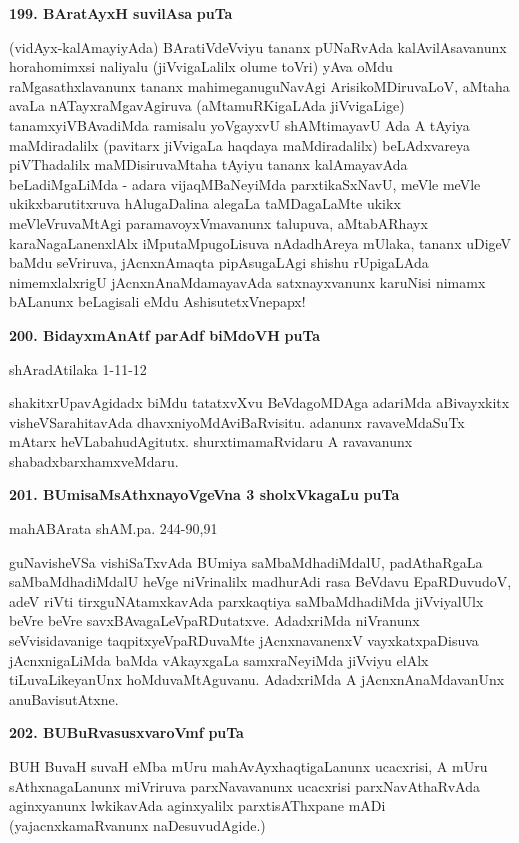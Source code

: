 \medskip
\noindent
\textbf{199. BAratAyxH suvilAsa} \hfill{\bf puTa \pageref{75a}}

\smallskip
(vidAyx-kalAmayiyAda) BAratiVdeVviyu tananx pUNaRvAda kalAvilAsavanunx horahomimxsi naliyalu (jiVvigaLalilx olume toVri) yAva oMdu raMgasathxlavanunx tananx mahimeganuguNavAgi ArisikoMDiruvaLoV, aMtaha avaLa nATayxraMgavAgiruva (aMtamuRKigaLAda jiVvigaLige) tanamxyiVBAvadiMda ramisalu yoVgayxvU shAMtimayavU Ada A tAyiya maMdiradalilx (pavitarx jiVvigaLa haqdaya maMdiradalilx) beLAdxvareya piVThadalilx maMDisiruvaMtaha tAyiyu tananx kalAmayavAda beLadiMgaLiMda - adara vijaqMBaNeyiMda parxtikaSxNavU, meVle meVle ukikxbarutitxruva hAlugaDalina alegaLa taMDagaLaMte ukikx meVleVruvaMtAgi paramavoyxVmavanunx talupuva, aMtabARhayx karaNagaLanenxlAlx iMputaMpugoLisuva nAdadhAreya mUlaka, tananx uDigeV baMdu seVriruva, jAcnxnAmaqta pipAsugaLAgi shishu rUpigaLAda nimemxlalxrigU jAcnxnAnaMdamayavAda satxnayxvanunx karuNisi nimamx bALanunx beLagisali eMdu AshisutetxVnepapx!

\medskip
\noindent
\textbf{200. BidayxmAnAtf parAdf biMdoVH} \hfill{\bf puTa \pageref{151c}}

\hfill{shAradAtilaka 1-11-12}

\smallskip
shakitxrUpavAgidadx biMdu tatatxvXvu BeVdagoMDAga adariMda aBivayxkitx visheVSarahitavAda dhavxniyoMdAviBaRvisitu. adanunx ravaveMdaSuTx mAtarx heVLabahudAgitutx. shurxtimamaRvidaru A ravavanunx shabadxbarxhamxveMdaru.

\medskip
\noindent
\textbf{201. BUmisaMsAthxnayoVgeVna 3 sholxVkagaLu} \hfill{\bf puTa \pageref{26}}

\hfill{mahABArata shAM.pa. 244-90,91}

\smallskip
guNavisheVSa vishiSaTxvAda BUmiya saMbaMdhadiMdalU, padAthaRgaLa saMbaMdhadiMdalU heVge niVrinalilx madhurAdi rasa BeVdavu EpaRDuvudoV, adeV riVti tirxguNAtamxkavAda parxkaqtiya saMbaMdhadiMda jiVviyalUlx beVre beVre savxBAvagaLeVpaRDutatxve. AdadxriMda niVranunx seVvisidavanige taqpitxyeVpaRDuvaMte jAcnxnavanenxV vayxkatxpaDisuva jAcnxnigaLiMda baMda vAkayxgaLa samxraNeyiMda jiVviyu elAlx tiLuvaLikeyanUnx hoMduvaMtAguvanu. AdadxriMda A jAcnxnAnaMdavanUnx anuBavisutAtxne.

\medskip
\noindent
\textbf{202. BUBuRvasusxvaroVmf} \hfill{\bf puTa \pageref{116b}}

\smallskip
BUH BuvaH suvaH eMba mUru mahAvAyxhaqtigaLanunx ucacxrisi, A mUru sAthxnagaLanunx miVriruva parxNavavanunx ucacxrisi parxNavAthaRvAda aginxyanunx lwkikavAda aginxyalilx parxtisAThxpane mADi (yajacnxkamaRvanunx naDesuvudAgide.)

